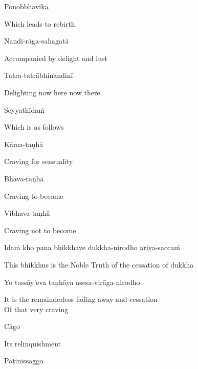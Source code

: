 Ponobbhavikā

\begin{cprenglish}
  Which leads to rebirth
\end{cprenglish}

Nandi-rāga-sahagatā

\begin{cprenglish}
  Accompanied by delight and lust
\end{cprenglish}

Tatra-tatrābhinandinī

\begin{cprenglish}
  Delighting now here now there
\end{cprenglish}

Seyyathīdaṁ

\begin{cprenglish}
  Which is as follows
\end{cprenglish}

Kāma-taṇhā

\begin{cprenglish}
  Craving for sensuality
\end{cprenglish}

Bhava-taṇhā

\begin{cprenglish}
  Craving to become
\end{cprenglish}

Vibhava-taṇhā

\begin{cprenglish}
  Craving not to become
\end{cprenglish}

Idaṁ kho pana bhikkhave dukkha-nirodho ariya-saccaṁ

\begin{cprenglish}
  This bhikkhus is the Noble Truth of the cessation of dukkha
\end{cprenglish}

Yo tassāy’eva taṇhāya asesa-virāga-nirodho

\begin{cprenglish}
  It is the remainderless fading away and cessation\\
  Of that very craving
\end{cprenglish}

Cāgo

\begin{cprenglish}
  Its relinquishment
\end{cprenglish}

Paṭinissaggo

